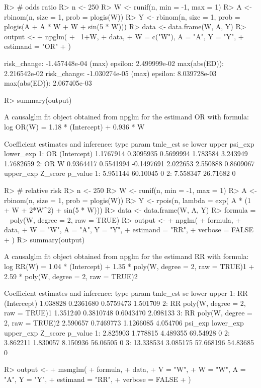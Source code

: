 \documentclass[
]{jss}
\begin{document}
\begin{CodeChunk}
\begin{CodeInput}
R> # odds ratio
R> n <- 250
R> W <- runif(n, min = -1,  max = 1)
R> A <- rbinom(n, size = 1, prob = plogis(W))
R> Y <- rbinom(n, size =  1, prob = plogis(A + A * W + W + sin(5 * W)))
R> data <- data.frame(W, A, Y)
R> output <-
+   npglm(
+     ~1+W,
+     data,
+     W = c("W"), A = "A", Y = "Y",
+     estimand = "OR" 
+   )
\end{CodeInput}
\begin{CodeOutput}
risk_change: -1.457448e-04 (max) epsilon: 2.499999e-02 max(abs(ED)): 2.216542e-02
risk_change: -1.030274e-05 (max) epsilon: 8.039728e-03 max(abs(ED)): 2.067405e-03
\end{CodeOutput}
\begin{CodeInput}
R> summary(output)
\end{CodeInput}
\begin{CodeOutput}
A causalglm fit object obtained from npglm for the estimand OR with formula: 
log OR(W) = 1.18 * (Intercept) + 0.936 * W

Coefficient estimates and inference:
   type       param  tmle_est        se      lower    upper  psi_exp lower_exp
1:   OR (Intercept) 1.1767914 0.3095935  0.5699994 1.783584 3.243949 1.7682659
2:   OR           W 0.9364417 0.5541994 -0.1497691 2.022653 2.550888 0.8609067
   upper_exp  Z_score p_value
1:  5.951144 60.10045       0
2:  7.558347 26.71682       0
\end{CodeOutput}
\begin{CodeInput}
R> # relative risk
R> n <- 250
R> W <- runif(n, min = -1,  max = 1)
R> A <- rbinom(n, size = 1, prob = plogis(W))
R> Y <- rpois(n, lambda = exp( A * (1 + W + 2*W^2)  + sin(5 * W)))
R> data <- data.frame(W, A, Y)
R> formula = ~ poly(W, degree = 2, raw = TRUE) 
R> output <-
+   npglm(
+     formula,
+     data,
+     W = "W", A = "A", Y = "Y",
+     estimand = "RR",
+     verbose = FALSE
+   )
R> summary(output)
\end{CodeInput}
\begin{CodeOutput}
A causalglm fit object obtained from npglm for the estimand RR with formula: 
log RR(W) = 1.04 * (Intercept) + 1.35 * poly(W, degree = 2, raw = TRUE)1 + 2.59 * poly(W, degree = 2, raw = TRUE)2

Coefficient estimates and inference:
   type                            param tmle_est        se     lower    upper
1:   RR                      (Intercept) 1.038828 0.2361680 0.5759473 1.501709
2:   RR poly(W, degree = 2, raw = TRUE)1 1.351240 0.3810748 0.6043470 2.098133
3:   RR poly(W, degree = 2, raw = TRUE)2 2.590657 0.7469773 1.1266085 4.054706
     psi_exp lower_exp upper_exp  Z_score p_value
1:  2.825903  1.778815  4.489355 69.54928       0
2:  3.862211  1.830057  8.150936 56.06505       0
3: 13.338534  3.085175 57.668196 54.83685       0
\end{CodeOutput}
\begin{CodeInput}
R> output <-
+   msmglm(
+     formula,
+     data,
+     V = "W",
+     W = "W", A = "A", Y = "Y",
+     estimand = "RR",
+     verbose = FALSE
+   )
\end{CodeInput}
\end{CodeChunk}
\end{document}
